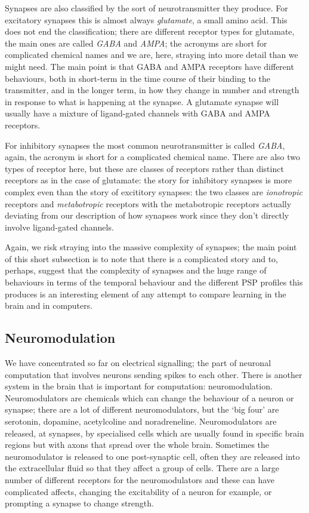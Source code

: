 \documentclass[12pt]{article}
\begin{document}
Synapses are also classified by the sort of neurotransmitter they
produce. For excitatory synapses this is almost always
\textsl{glutamate}, a small amino acid. This does not end the
classification; there are different receptor types for glutamate, the
main ones are called \textsl{GABA} and \textsl{AMPA}; the acronyms are
short for complicated chemical names and we are, here, straying into
more detail than we might need. The main point is that GABA and AMPA
receptors have different behaviours, both in short-term in the time
course of their binding to the transmitter, and in the longer term, in
how they change in number and strength in response to what is
happening at the synapse. A glutamate synapse will usually have a
mixture of ligand-gated channels with GABA and AMPA receptors.

For inhibitory synapses the most common neurotransmitter is called
\textsl{GABA}, again, the acronym is short for a complicated chemical
name. There are also two types of receptor here, but these are classes
of receptors rather than distinct receptors as in the case of
glutamate: the story for inhibitory synapses is more complex even than
the story of excititory synapses: the two classes are
\textsl{ionotropic} receptors and \textsl{metabotropic} receptors with
the metabotropic receptors actually deviating from our description of
how synapses work since they don't directly involve ligand-gated
channels.

Again, we risk straying into the massive complexity of synapses; the
main point of this short subsection is to note that there is a
complicated story and to, perhaps, suggest that the complexity of
synapses and the huge range of behaviours in terms of the temporal
behaviour and the different PSP profiles this produces is an
interesting element of any attempt to compare learning in the brain
and in computers.

\subsection*{Neuromodulation}

We have concentrated so far on electrical signalling; the part of
neuronal computation that involves neurons sending spikes to each
other. There is another system in the brain that is important for
computation: neuromodulation. Neuromodulators are chemicals which can
change the behaviour of a neuron or synapse; there are a lot of
different neuromodulators, but the `big four' are serotonin, dopamine,
acetylcoline and noradreneline. Neuromodulators are released, at
synapses, by specialised cells which are usually found in specific
brain regions but with axons that spread over the whole
brain. Sometimes the neuromodulator is released to one post-synaptic
cell, often they are released into the extracellular fluid so that
they affect a group of cells. There are a large number of different
receptors for the neuromodulators and these can have complicated
affects, changing the excitability of a neuron for example, or
prompting a synapse to change strength.
\end{document}
